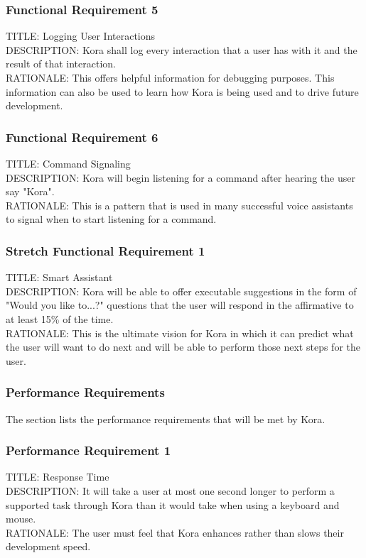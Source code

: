 \documentclass[onecolumn, draftclsnofoot,10pt, compsoc]{IEEEtran}
\def \botname{Kora\xspace}
\begin{document}
	\subsubsection{Functional Requirement 5}
	TITLE: Logging User Interactions \\
	DESCRIPTION: \botname shall log every interaction that a user has with it and the result of that interaction. \\
	RATIONALE: This offers helpful information for debugging purposes. This information can also be used to learn how \botname is being used and to drive future development.

	\subsubsection{Functional Requirement 6}
	TITLE: Command Signaling \\
	DESCRIPTION: \botname will begin listening for a command after hearing the user say "\botname". \\
	RATIONALE: This is a pattern that is used in many successful voice assistants to signal when to start listening for a command.


	\subsubsection{Stretch Functional Requirement 1}
	TITLE: Smart Assistant \\
	DESCRIPTION: \botname will be able to offer executable suggestions in the form of "Would you like to...?" questions that the user will respond in the affirmative to at least 15\% of the time. \\
	RATIONALE: This is the ultimate vision for \botname in which it can predict what the user will want to do next and will be able to perform those next steps for the user.

	\subsubsection{Performance Requirements}
	The section lists the performance requirements that will be met by \botname.

	\subsubsection{Performance Requirement 1}
	TITLE: Response Time \\
	DESCRIPTION: It will take a user at most one second longer to perform a supported task through \botname than it would take when using a keyboard and mouse. \\
	RATIONALE: The user must feel that \botname enhances rather than slows their development speed.
\end{document}
